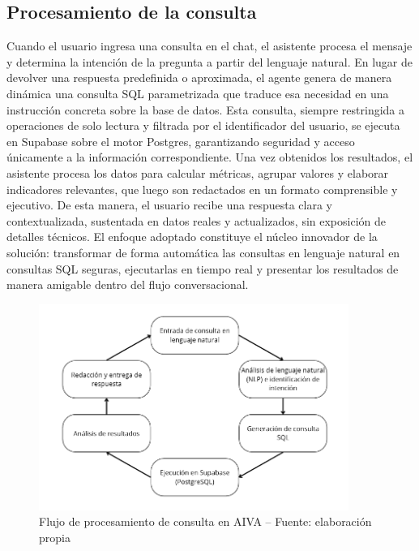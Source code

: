 \subsection{Procesamiento de la consulta}

Cuando el usuario ingresa una consulta en el chat, el asistente procesa el mensaje y determina la intención de la pregunta a partir del lenguaje natural. En lugar de devolver una respuesta predefinida o aproximada, el agente genera de manera dinámica una consulta SQL parametrizada que traduce esa necesidad en una instrucción concreta sobre la base de datos. Esta consulta, siempre restringida a operaciones de solo lectura y filtrada por el identificador del usuario, se ejecuta en Supabase sobre el motor Postgres, garantizando seguridad y acceso únicamente a la información correspondiente. Una vez obtenidos los resultados, el asistente procesa los datos para calcular métricas, agrupar valores y elaborar indicadores relevantes, que luego son redactados en un formato comprensible y ejecutivo. De esta manera, el usuario recibe una respuesta clara y contextualizada, sustentada en datos reales y actualizados, sin exposición de detalles técnicos. El enfoque adoptado constituye el núcleo innovador de la solución: transformar de forma automática las consultas en lenguaje natural en consultas SQL seguras, ejecutarlas en tiempo real y presentar los resultados de manera amigable dentro del flujo conversacional.



\begin{figure}[!htbp]
 \centering

 \includegraphics[width=0.9\textwidth]{images/ConsultaSQL.png}

 \caption{Flujo de procesamiento de consulta en AIVA -- Fuente: elaboración propia}

 \label{fig:flujo-consulta}

\end{figure}



